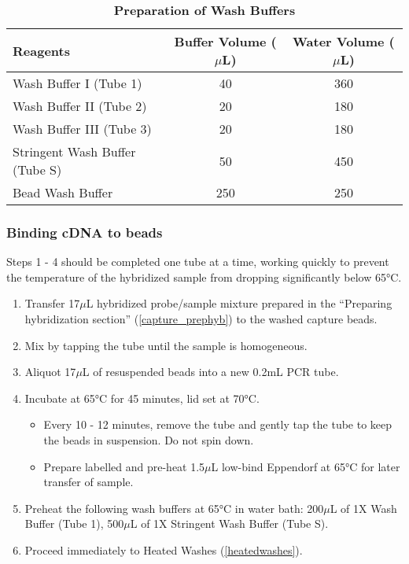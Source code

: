 \vspace{1cm}
\begin{table}[h]
	\centering	
	\caption[Preparation of Wash Buffers]%
	{\textbf{Preparation of Wash Buffers}}
	\label{tab:washbuffer}	
	\begin{tabularx}{0.9\textwidth}{lcc}
		\toprule
		Reagents                       & Buffer Volume ($\mu$L) & Water Volume ($\mu$L) \\ \midrule
		Wash Buffer I (Tube 1)         & 40                 & 360              \\
		Wash Buffer II (Tube 2)        & 20                 & 180              \\
		Wash Buffer III (Tube 3)      & 20                 & 180              \\
		Stringent Wash Buffer (Tube S) & 50                 & 450              \\
		Bead Wash Buffer               & 250                & 250              \\ \bottomrule
	\end{tabularx}
\end{table}

\subsubsection{Binding cDNA to beads}
Steps 1 - 4 should be completed one tube at a time, working quickly to prevent the temperature of the hybridized sample from dropping significantly below 65°C.
\begin{enumerate}
	\item Transfer 17$\mu$L hybridized probe/sample mixture prepared in the “Preparing hybridization section” (\cref{capture_prephyb}) to the washed capture beads.
	\item Mix by tapping the tube until the sample is homogeneous. 
	\item Aliquot 17$\mu$L of resuspended beads into a new 0.2mL PCR tube. 
	\item Incubate at 65°C for 45 minutes, lid set at 70°C.
	\begin{itemize}
		\item Every 10 - 12 minutes, remove the tube and gently tap the tube to keep the beads in suspension. Do not spin down.
		\item Prepare labelled and pre-heat 1.5$\mu$L low-bind Eppendorf at 65°C for later transfer of sample. 
	\end{itemize} 
	\item Preheat the following wash buffers at 65°C in water bath: 200$\mu$L of 1X Wash Buffer (Tube 1), 500$\mu$L of 1X Stringent Wash Buffer (Tube S).
	\item Proceed immediately to Heated Washes (\cref{heatedwashes}).
\end{enumerate} 


